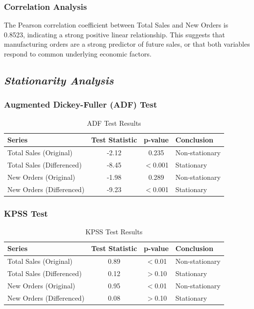 \documentclass[12pt]{article}
\begin{document}
\subsubsection*{Correlation Analysis}

The Pearson correlation coefficient between Total Sales and New Orders is 0.8523, indicating a strong positive linear relationship. This suggests that manufacturing orders are a strong predictor of future sales, or that both variables respond to common underlying economic factors.

\subsection*{\textit{Stationarity Analysis}}

\subsubsection*{Augmented Dickey-Fuller (ADF) Test}

\begin{table}[H]
\centering
\caption{ADF Test Results}
\begin{tabular}{lccl}
\toprule
Series & Test Statistic & p-value & Conclusion \\
\midrule
Total Sales (Original) & -2.12 & 0.235 & Non-stationary \\
Total Sales (Differenced) & -8.45 & $<$0.001 & Stationary \\
New Orders (Original) & -1.98 & 0.289 & Non-stationary \\
New Orders (Differenced) & -9.23 & $<$0.001 & Stationary \\
\bottomrule
\end{tabular}
\end{table}

\subsubsection*{KPSS Test}

\begin{table}[H]
\centering
\caption{KPSS Test Results}
\begin{tabular}{lccl}
\toprule
Series & Test Statistic & p-value & Conclusion \\
\midrule
Total Sales (Original) & 0.89 & $<$0.01 & Non-stationary \\
Total Sales (Differenced) & 0.12 & $>$0.10 & Stationary \\
New Orders (Original) & 0.95 & $<$0.01 & Non-stationary \\
New Orders (Differenced) & 0.08 & $>$0.10 & Stationary \\
\bottomrule
\end{tabular}
\end{table}
\end{document}
